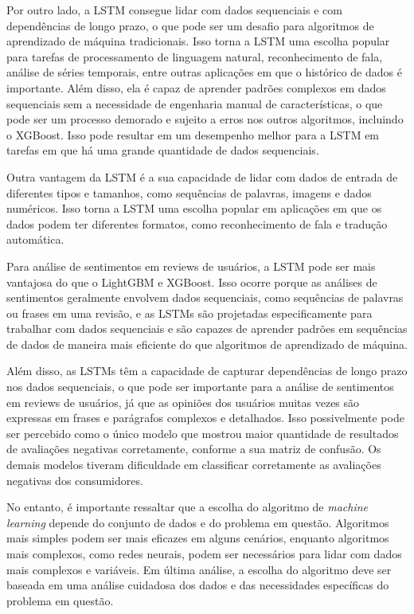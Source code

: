 Por outro lado, a LSTM consegue lidar com dados sequenciais e com dependências de longo prazo, o que pode ser um desafio para algoritmos de aprendizado de máquina tradicionais. Isso torna a LSTM uma escolha popular para tarefas de processamento de linguagem natural, reconhecimento de fala, análise de séries temporais, entre outras aplicações em que o histórico de dados é importante. Além disso, ela é capaz de aprender padrões complexos em dados sequenciais sem a necessidade de engenharia manual de características, o que pode ser um processo demorado e sujeito a erros nos outros algoritmos, incluindo o XGBoost. Isso pode resultar em um desempenho melhor para a LSTM em tarefas em que há uma grande quantidade de dados sequenciais.

Outra vantagem da LSTM é a sua capacidade de lidar com dados de entrada de diferentes tipos e tamanhos, como sequências de palavras, imagens e dados numéricos. Isso torna a LSTM uma escolha popular em aplicações em que os dados podem ter diferentes formatos, como reconhecimento de fala e tradução automática.

Para análise de sentimentos em reviews de usuários, a LSTM pode ser mais vantajosa do que o LightGBM e XGBoost. Isso ocorre porque as análises de sentimentos geralmente envolvem dados sequenciais, como sequências de palavras ou frases em uma revisão, e as LSTMs são projetadas especificamente para trabalhar com dados sequenciais e são capazes de aprender padrões em sequências de dados de maneira mais eficiente do que algoritmos de aprendizado de máquina.

Além disso, as LSTMs têm a capacidade de capturar dependências de longo prazo nos dados sequenciais, o que pode ser importante para a análise de sentimentos em reviews de usuários, já que as opiniões dos usuários muitas vezes são expressas em frases e parágrafos complexos e detalhados. Isso possivelmente pode ser percebido como o único modelo que mostrou maior quantidade de resultados de avaliações negativas corretamente, conforme a sua matriz de confusão. Os demais modelos tiveram dificuldade em classificar corretamente as avaliações negativas dos consumidores.

No entanto, é importante ressaltar que a escolha do algoritmo de \textit{machine learning} depende do conjunto de dados e do problema em questão. Algoritmos mais simples podem ser mais eficazes em alguns cenários, enquanto algoritmos mais complexos, como redes neurais, podem ser necessários para lidar com dados mais complexos e variáveis. Em última análise, a escolha do algoritmo deve ser baseada em uma análise cuidadosa dos dados e das necessidades específicas do problema em questão.